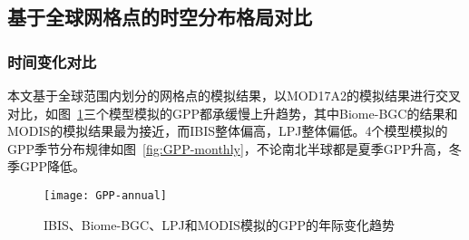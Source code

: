
\subsection{基于全球网格点的时空分布格局对比}
\subsubsection{时间变化对比}
本文基于全球范围内划分的网格点的模拟结果，以MOD17A2的模拟结果进行交叉对比，如图~\ref{fig:GPP-annual}三个模型模拟的GPP都承缓慢上升趋势，其中Biome-BGC的结果和MODIS的模拟结果最为接近，而IBIS整体偏高，LPJ整体偏低。4个模型模拟的GPP季节分布规律如图~\ref{fig:GPP-monthly}，不论南北半球都是夏季GPP升高，冬季GPP降低。

\begin{figure}[!htbp]
    \centering
    \texttt{[image: GPP-annual]}
    \caption{IBIS、Biome-BGC、LPJ和MODIS模拟的GPP的年际变化趋势}
    \label{fig:GPP-annual}
\end{figure}


